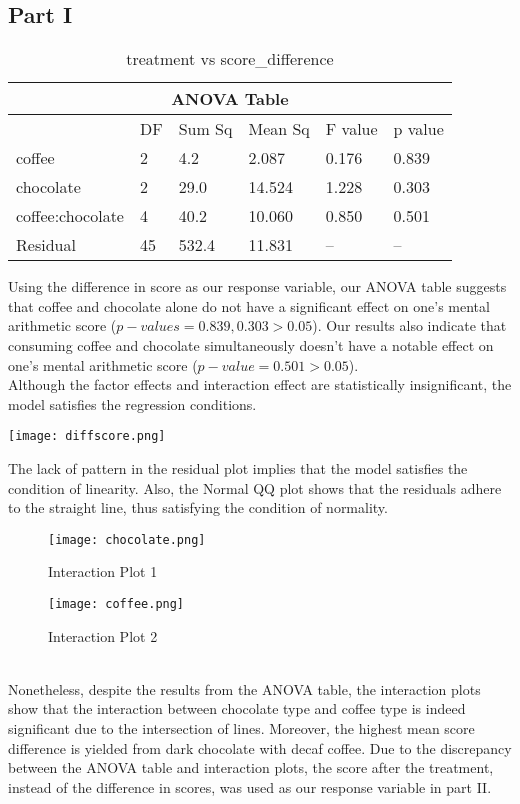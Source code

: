\documentclass[12pt]{article}
\begin{document}
\begin{flushleft}
\subsection{Part I}
\begin{table}[h]
\caption{treatment vs score\_difference}
\begin{tabular}{ |p{3cm}|p{2cm}|p{2cm}|p{2cm}|p{2cm}|p{2cm}| }
 \hline
 \multicolumn{6}{|c|}{ANOVA Table} \\
 \hline
  & DF & Sum Sq & Mean Sq & F value & p value\\
 \hline
coffee   & 2  & 4.2 & 2.087 & 0.176 & 0.839 \\
chocolate  & 2 & 29.0 & 14.524 & 1.228 & 0.303\\
coffee:chocolate & 4 & 40.2 & 10.060 & 0.850 &0.501\\
Residual & 45 & 532.4 & 11.831 & -- & --\\
 \hline
\end{tabular}
\end{table}
Using the difference in score as our response variable, our ANOVA table suggests that coffee and chocolate alone do not have a significant effect on one\rq s mental arithmetic score ($p-values = 0.839,  0.303 > 0.05$). Our results also indicate that consuming coffee and chocolate simultaneously doesn\rq t have a notable effect on one\rq s mental arithmetic score ($p-value = 0.501 > 0.05$). 
\bigskip
\\Although the factor effects and interaction effect are statistically insignificant, the model satisfies the regression conditions.
\begin{center}
\texttt{[image: diffscore.png]}
\end{center}
The lack of pattern in the residual plot implies that the model satisfies the condition of linearity. Also, the Normal QQ plot shows that the residuals adhere to the straight line, thus satisfying the condition of normality. 
\begin{figure}[h]
  \centering
  \begin{minipage}[b]{0.47\textwidth}
    \texttt{[image: chocolate.png]}
    \caption{Interaction Plot 1}
  \end{minipage}
  \hfill
  \begin{minipage}[b]{0.47\textwidth}
    \texttt{[image: coffee.png]}
    \caption{Interaction Plot 2}
  \end{minipage}
\end{figure}
\\ Nonetheless, despite the results from the ANOVA table, the interaction plots show that the interaction between chocolate type and coffee type is indeed significant due to the intersection of lines. Moreover, the highest mean score difference is yielded from dark chocolate with decaf coffee. Due to the discrepancy between the ANOVA table and interaction plots, the score after the treatment, instead of the difference in scores, was used as our response variable in part II.
\bigskip

\end{flushleft}
\end{document}
